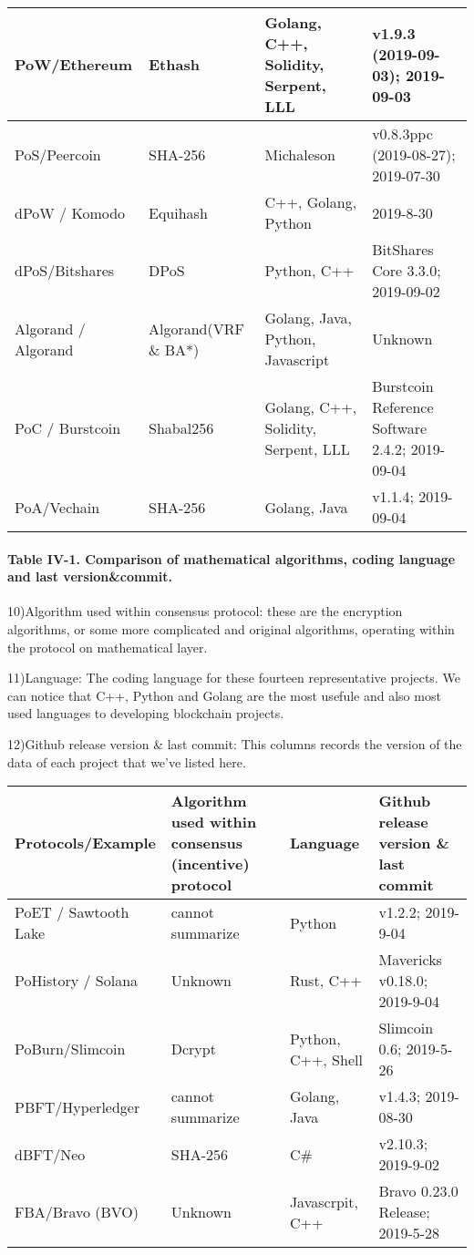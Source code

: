 \documentclass[doublespacing]{bmcart}
\begin{document}
\begin{CJK*}{UTF8}{gbsn}
\begin{tabular}{p{2cm}p{3cm}p{3cm}p{3cm}}
PoW/Ethe\-reum  
& Ethash & Golang, C++, Solidity, Serpent, LLL & 	v1.9.3 (2019-09-03); 2019-09-03 \\ \hline

PoS/Peercoin & SHA-256 & Michaleson & 	v0.8.3ppc (2019-08-27); 2019-07-30 \\ \hline

dPoW / Komodo & Equihash & C++, Golang, Python & 2019-8-30 \\ \hline

dPoS/\newline Bitshares  & DPoS & Python, C++ & BitShares Core 3.3.0; 2019-09-02  \\ \hline

Algorand / Algorand & Algorand(VRF \& BA*) & Golang, Java, Python, Javascript & Unknown \\ \hline
PoC / Burstcoin & Shabal256 & Golang, C++, Solidity, Serpent, LLL & Burstcoin Reference Software 2.4.2; 2019-09-04 \\ \hline
PoA/Vechain & SHA-256 & Golang, Java & v1.1.4; 2019-09-04 \\ \hline
\end{tabular}
\paragraph{Table IV-1. Comparison of mathematical algorithms, coding language and last version\&commit.}

10)Algorithm used within consensus protocol: these are the encryption algorithms, or some more complicated and original algorithms, operating within the protocol on mathematical layer. 

11)Language: The coding language for these fourteen representative projects. We can notice that C++, Python and Golang are the most usefule and also most used languages to developing blockchain projects.

12)Github release version \& last commit: This columns records the version of the data of each project that we've listed here. 

\begin{tabular}{p{2cm}p{3cm}p{3cm}p{3cm}}
\hline
Protocols/E\-xample 
& Algorithm used within consensus (incentive) protocol 
& Language 
& Github release version \& last commit \\ \hline

PoET / Sawtooth Lake & cannot summarize & Python & v1.2.2; 2019-9-04\\ \hline
PoHistory / Solana & Unknown & Rust, C++ & Mavericks v0.18.0; 2019-9-04 \\ \hline
PoBurn/\newline Slimcoin &  Dcrypt & Python, C++, Shell & Slimcoin 0.6; 2019-5-26  \\ \hline
PBFT/Hyp\-erledger & cannot summarize & Golang, Java & v1.4.3; 2019-08-30  \\ \hline
dBFT/Neo & SHA-256 & C\# &  v2.10.3; 2019-9-02  \\ \hline
FBA/Bravo (BVO) & Unknown & Javascrpit, C++ & Bravo 0.23.0 Release; 2019-5-28 \\ \hline


\end{tabular}
\end{CJK*}
\end{document}
